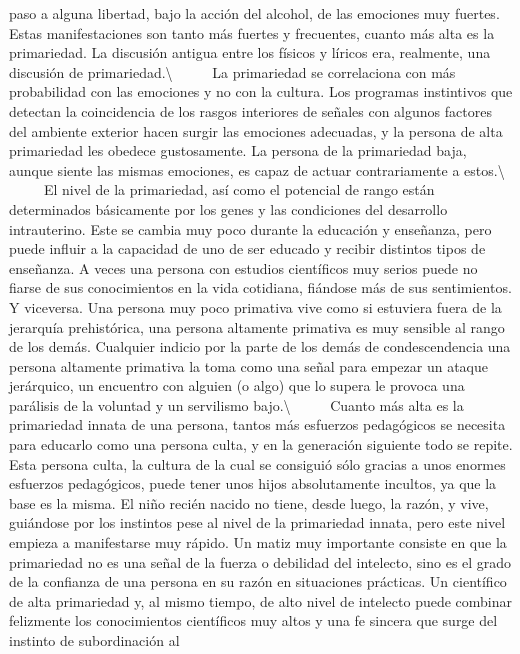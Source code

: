 paso a alguna libertad, bajo la acción del alcohol, de las emociones muy
fuertes. Estas manifestaciones son tanto más fuertes y frecuentes,
cuanto más alta es la primariedad. La discusión antigua entre los
físicos y líricos era, realmente, una discusión de
primariedad.\textbackslash{} ~ ~ ~ La primariedad se correlaciona con
más probabilidad con las emociones y no con la cultura. Los programas
instintivos que detectan la coincidencia de los rasgos interiores de
señales con algunos factores del ambiente exterior hacen surgir las
emociones adecuadas, y la persona de alta primariedad les obedece
gustosamente. La persona de la primariedad baja, aunque siente las
mismas emociones, es capaz de actuar contrariamente a
estos.\textbackslash{} ~ ~ ~ El nivel de la primariedad, así como el
potencial de rango están determinados básicamente por los genes y las
condiciones del desarrollo intrauterino. Este se cambia muy poco durante
la educación y enseñanza, pero puede influir a la capacidad de uno de
ser educado y recibir distintos tipos de enseñanza. A veces una persona
con estudios científicos muy serios puede no fiarse de sus conocimientos
en la vida cotidiana, fiándose más de sus sentimientos. Y viceversa. Una
persona muy poco primativa vive como si estuviera fuera de la jerarquía
prehistórica, una persona altamente primativa es muy sensible al rango
de los demás. Cualquier indicio por la parte de los demás de
condescendencia una persona altamente primativa la toma como una señal
para empezar un ataque jerárquico, un encuentro con alguien (o algo) que
lo supera le provoca una parálisis de la voluntad y un servilismo
bajo.\textbackslash{} ~ ~ ~ Cuanto más alta es la primariedad innata de
una persona, tantos más esfuerzos pedagógicos se necesita para educarlo
como una persona culta, y en la generación siguiente todo se repite.
Esta persona culta, la cultura de la cual se consiguió sólo gracias a
unos enormes esfuerzos pedagógicos, puede tener unos hijos absolutamente
incultos, ya que la base es la misma. El niño recién nacido no tiene,
desde luego, la razón, y vive, guiándose por los instintos pese al nivel
de la primariedad innata, pero este nivel empieza a manifestarse muy
rápido. Un matiz muy importante consiste en que la primariedad no es una
señal de la fuerza o debilidad del intelecto, sino es el grado de la
confianza de una persona en su razón en situaciones prácticas. Un
científico de alta primariedad y, al mismo tiempo, de alto nivel de
intelecto puede combinar felizmente los conocimientos científicos muy
altos y una fe sincera que surge del instinto de subordinación al
